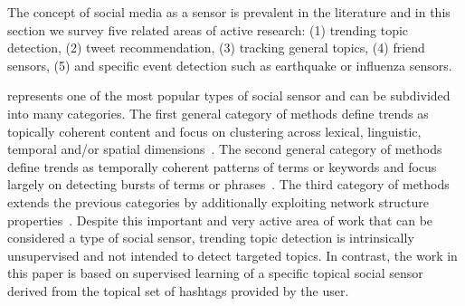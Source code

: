 %
%
%
%
%

The concept of social media as a sensor is prevalent in the literature
and in this section we survey five related areas of active research:
(1) trending topic detection, (2) tweet recommendation, (3) tracking general topics, (4) friend
sensors, (5) and specific event detection such as earthquake or
influenza sensors.  

\vspace{2mm}
 represents one of the most popular
types of social sensor and can be subdivided into many categories.  The
first general category of methods define trends as topically coherent
content and focus on clustering across lexical, linguistic, temporal
and/or spatial
dimensions~\citep{petrovic,ishikawa,murata,becker,tweetmotif,wangLee}.
The second general category of methods define trends as temporally
coherent patterns of terms or keywords and focus largely on detecting
bursts of terms or
phrases~\citep{mathioudakis,cuiZhang,zhaoSports,nichols,aiello}.
%
The third category of methods extends the previous categories by
additionally exploiting network structure properties~\citep{budak}.
Despite this important and very active area of work that can be
considered a type of social sensor, trending topic detection is
intrinsically unsupervised and not intended to detect targeted topics.
In contrast, the work in this paper is based on supervised learning of
a specific topical social sensor derived from the topical set of
hashtags provided by the user.

